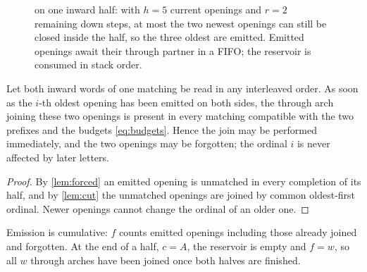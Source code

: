 \begin{figure}[t]
\centering
{}
\caption{ on one inward half: with $h=5$ current openings
and $r=2$ remaining down steps, at most the two newest openings can still be
closed inside the half, so the three oldest are emitted. Emitted openings
await their through partner in a FIFO; the reservoir is consumed in stack
order.}
\label{fig:forced}
\end{figure}

\begin{corollary}
\label{cor:fifo}
\leanok
{}
Let both inward words of one matching be read in any interleaved order. As soon
as the $i$-th oldest opening has been emitted on both sides, the through arch
joining these two openings is present in every matching compatible with the
two prefixes and the budgets \eqref{eq:budgets}. Hence the join may be
performed immediately, and the two openings may be forgotten; the ordinal $i$ is
never affected by later letters.
\end{corollary}

\begin{proof}
\leanok
By \cref{lem:forced} an emitted opening is unmatched in every completion of its
half, and by \cref{lem:cut} the unmatched openings are joined by common oldest-first
ordinal. Newer openings cannot change the ordinal of an older one.
\end{proof}

Emission is cumulative: $f$ counts emitted openings including those already
joined and forgotten. At the end of a half, $c=A$, the reservoir is empty and
$f=w$, so all $w$ through arches have been joined once both halves are finished.
